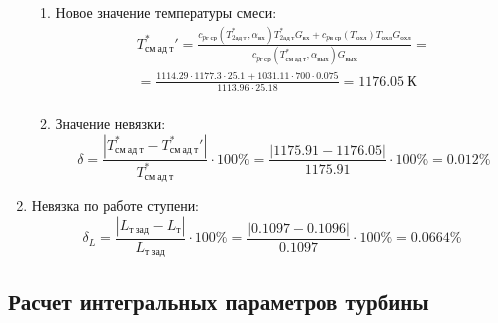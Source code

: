 \documentclass[a4paper,10pt]{article}
\begin{document}
\begin{enumerate}
\begin{enumerate}
            \item Новое значение температуры смеси:
            \begin{gather*}
                T_{см\ ад\ т}^*\prime = \frac{
                        c_{pг\ ср} (T_{2ад\ т}^*, \alpha_{вх}) T_{2ад\ т}^* G_{вх} + c_{pв\ ср} (T_{охл}) T_{охл} G_{охл}
                    }{
                        c_{pг\ ср} (T_{см\ ад\ т}^{*}, \alpha_{вых}) G_{вых}
                    } =\\
                = \frac{
                    1114.29
                    \cdot 1177.3 \cdot 25.1 +
                    1031.11
                    \cdot 700 \cdot 0.075
                }{
                    1113.96
                    \cdot  25.18
                } =
                1176.05\ К\\
            \end{gather*}

            \item Значение невязки:
            \[
                \delta = \frac{ \left| T_{см\ ад\ т}^{*} - T_{см\ ад\ т}^*\prime \right| }{T_{см\ ад\ т}^{*}} \cdot 100 \% =
                    \frac{
                        \left| 1175.91 - 1176.05 \right|
                    }{
                        1175.91
                    } \cdot 100 \% =
                0.012 \%
            \]
        \end{enumerate}

        

        \item Невязка по работе ступени:
        \[
            \delta_L = \frac{ \left| L_{т\ зад} - L_т \right| }{ L_{т\ зад} } \cdot 100 \% =
                \frac{
                    \left| 0.1097 - 0.1096 \right|
                }{
                    0.1097 } \cdot 100 \% =
            0.0664 \%
        \]

    \end{enumerate}
     

    \subsection{Расчет интегральных параметров турбины}

    
\end{document}
